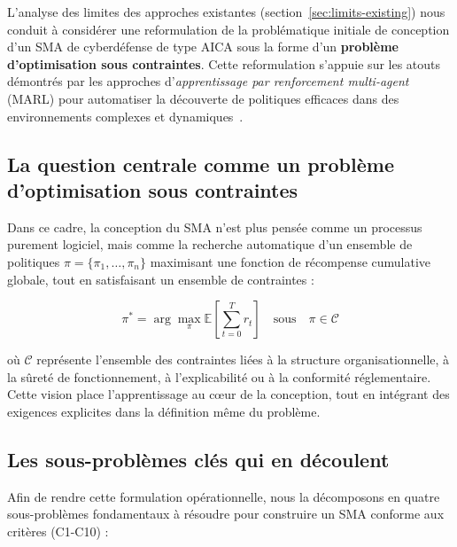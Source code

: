 \documentclass[ twoside,openright,titlepage,numbers=noenddot,headinclude,%
                footinclude=true,cleardoublepage=empty,abstractoff, %
                BCOR=5mm,paper=a4,fontsize=11pt,%
                french,american,%
                ]{scrreprt}
\begin{document}
L'analyse des limites des approches existantes (section~\ref{sec:limits-existing}) nous conduit à considérer une reformulation de la problématique initiale de conception d'un SMA de cyberdéfense de type AICA sous la forme d'un \textbf{problème d'optimisation sous contraintes}. Cette reformulation s'appuie sur les atouts démontrés par les approches d'\textit{apprentissage par renforcement multi-agent} (MARL) pour automatiser la découverte de politiques efficaces dans des environnements complexes et dynamiques~\cite{Zhang2021survey, Papoudakis2021}.

\subsection{La question centrale comme un problème d'optimisation sous contraintes}

Dans ce cadre, la conception du SMA n'est plus pensée comme un processus purement logiciel, mais comme la recherche automatique d'un ensemble de politiques \(\pi = \{\pi_1, \dots, \pi_n\}\) maximisant une fonction de récompense cumulative globale, tout en satisfaisant un ensemble de contraintes :

\begin{equation}
    \pi^* = \arg\max_{\pi} \mathbb{E}\left[\sum_{t=0}^{T} r_t\right] \quad \text{sous} \quad \pi \in \mathcal{C}
\end{equation}

où \(\mathcal{C}\) représente l'ensemble des contraintes liées à la structure organisationnelle, à la sûreté de fonctionnement, à l'explicabilité ou à la conformité réglementaire. Cette vision place l'apprentissage au cœur de la conception, tout en intégrant des exigences explicites dans la définition même du problème.

\subsection{Les sous-problèmes clés qui en découlent}

Afin de rendre cette formulation opérationnelle, nous la décomposons en quatre sous-problèmes fondamentaux à résoudre pour construire un SMA conforme aux critères (C1-C10) :
\end{document}
